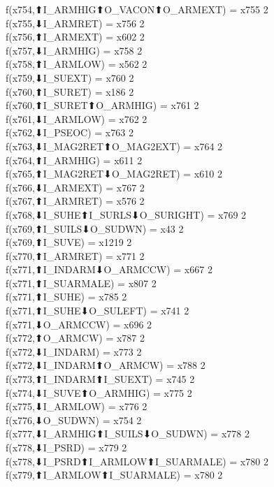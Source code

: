 f(x754,⬆I_ARMHIG⬆O_VACON⬆O_ARMEXT) = x755 {2} \\
f(x755,⬇I_ARMRET) = x756 {2} \\
f(x756,⬆I_ARMEXT) = x602 {2} \\
f(x757,⬇I_ARMHIG) = x758 {2} \\
f(x758,⬆I_ARMLOW) = x562 {2} \\
f(x759,⬇I_SUEXT) = x760 {2} \\
f(x760,⬆I_SURET) = x186 {2} \\
f(x760,⬆I_SURET⬆O_ARMHIG) = x761 {2} \\
f(x761,⬇I_ARMLOW) = x762 {2} \\
f(x762,⬇I_PSEOC) = x763 {2} \\
f(x763,⬇I_MAG2RET⬆O_MAG2EXT) = x764 {2} \\
f(x764,⬆I_ARMHIG) = x611 {2} \\
f(x765,⬆I_MAG2RET⬇O_MAG2RET) = x610 {2} \\
f(x766,⬇I_ARMEXT) = x767 {2} \\
f(x767,⬆I_ARMRET) = x576 {2} \\
f(x768,⬇I_SUHE⬆I_SURLS⬇O_SURIGHT) = x769 {2} \\
f(x769,⬆I_SUILS⬇O_SUDWN) = x43 {2} \\
f(x769,⬆I_SUVE) = x1219 {2} \\
f(x770,⬆I_ARMRET) = x771 {2} \\
f(x771,⬆I_INDARM⬇O_ARMCCW) = x667 {2} \\
f(x771,⬆I_SUARMALE) = x807 {2} \\
f(x771,⬆I_SUHE) = x785 {2} \\
f(x771,⬆I_SUHE⬇O_SULEFT) = x741 {2} \\
f(x771,⬇O_ARMCCW) = x696 {2} \\
f(x772,⬆O_ARMCW) = x787 {2} \\
f(x772,⬇I_INDARM) = x773 {2} \\
f(x772,⬇I_INDARM⬆O_ARMCW) = x788 {2} \\
f(x773,⬆I_INDARM⬆I_SUEXT) = x745 {2} \\
f(x774,⬇I_SUVE⬆O_ARMHIG) = x775 {2} \\
f(x775,⬇I_ARMLOW) = x776 {2} \\
f(x776,⬇O_SUDWN) = x754 {2} \\
f(x777,⬇I_ARMHIG⬆I_SUILS⬇O_SUDWN) = x778 {2} \\
f(x778,⬇I_PSRD) = x779 {2} \\
f(x778,⬇I_PSRD⬆I_ARMLOW⬆I_SUARMALE) = x780 {2} \\
f(x779,⬆I_ARMLOW⬆I_SUARMALE) = x780 {2} \\
